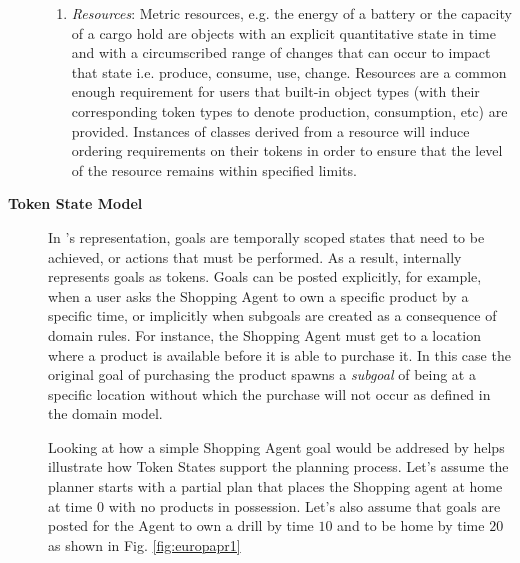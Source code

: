 \begin{description}
\begin{enumerate}
\item \textit{Resources}: Metric resources, e.g. the energy of a
  battery or the capacity of a cargo hold are objects with an explicit
  quantitative state in time and with a circumscribed range of changes
  that can occur to impact that state i.e. produce, consume, use,
  change.  Resources are a common enough requirement for \eu users
  that built-in object types (with their corresponding token types to
  denote production, consumption, etc) are provided.  Instances of
  classes derived from a resource will induce ordering requirements on
  their tokens in order to ensure that the level of the resource
  remains within specified limits.

\end{enumerate}

\item[\textbf{Token State Model}] In \eu's representation, goals are
  temporally scoped states that need to be achieved, or actions that
  must be performed. As a result, \eu internally represents goals as
  tokens.  Goals can be posted explicitly, for example, when a user
  asks the Shopping Agent to own a specific product by a specific
  time, or implicitly when subgoals are created as a consequence of
  domain rules. For instance, the Shopping Agent must get to a
  location where a product is available before it is able to purchase
  it. In this case the original goal of purchasing the product spawns
  a \emph{subgoal} of being at a specific location without which the
  purchase will not occur as defined in the domain model.  

  Looking at how a simple Shopping Agent goal would be addresed by \eu
  helps illustrate how Token States support the planning process.
  Let's assume the planner starts with a partial plan that places the
  Shopping agent at home at time $0$ with no products in
  possession. Let's also assume that goals are posted for the Agent to
  own a drill by time $10$ and to be home by time $20$ as shown in
  Fig. \ref{fig:europapr1}
  

\end{description}
